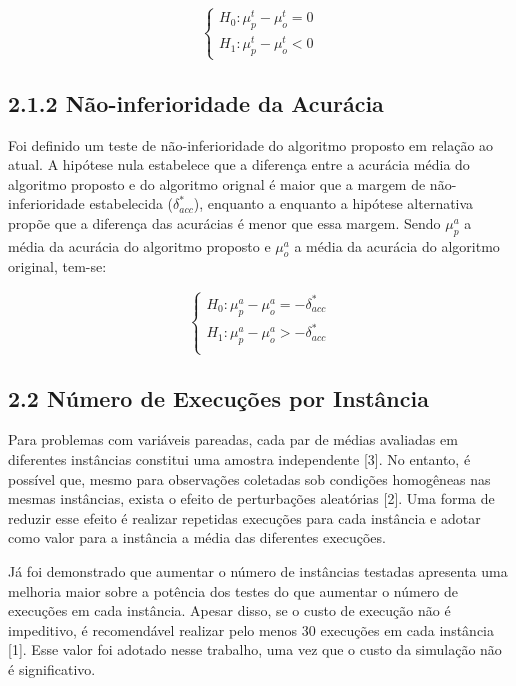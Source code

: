 \documentclass[]{article}
\begin{document}
\[
\left\{\begin{array}{rc}
H_{0}: \mu_p^t - \mu_o^t = 0\\
H_{1}: \mu_p^t - \mu_o^t < 0
\end{array}\right.
\]

\subsection{2.1.2 Não-inferioridade da
Acurácia}\label{nao-inferioridade-da-acuracia}

Foi definido um teste de não-inferioridade do algoritmo proposto em
relação ao atual. A hipótese nula estabelece que a diferença entre a
acurácia média do algoritmo proposto e do algoritmo orignal é maior que
a margem de não-inferioridade estabelecida (\(\delta_{acc}^{*}\)),
enquanto a enquanto a hipótese alternativa propõe que a diferença das
acurácias é menor que essa margem. Sendo \(\mu_p^{a}\) a média da
acurácia do algoritmo proposto e \(\mu_o^{a}\) a média da acurácia do
algoritmo original, tem-se:

\[
\left\{\begin{array}{rc}
H_{0}: \mu_p^{a} - \mu_o^{a} = -\delta^{*}_{acc}\\
H_{1}: \mu_p^{a} - \mu_o^{a} > -\delta^{*}_{acc}\\
\end{array}\right.
\]

\subsection{2.2 Número de Execuções por
Instância}\label{numero-de-execucoes-por-instancia}

Para problemas com variáveis pareadas, cada par de médias avaliadas em
diferentes instâncias constitui uma amostra independente {[}3{]}. No
entanto, é possível que, mesmo para observações coletadas sob condições
homogêneas nas mesmas instâncias, exista o efeito de perturbações
aleatórias {[}2{]}. Uma forma de reduzir esse efeito é realizar
repetidas execuções para cada instância e adotar como valor para a
instância a média das diferentes execuções.

Já foi demonstrado que aumentar o número de instâncias testadas
apresenta uma melhoria maior sobre a potência dos testes do que aumentar
o número de execuções em cada instância. Apesar disso, se o custo de
execução não é impeditivo, é recomendável realizar pelo menos 30
execuções em cada instância {[}1{]}. Esse valor foi adotado nesse
trabalho, uma vez que o custo da simulação não é significativo.
\end{document}

